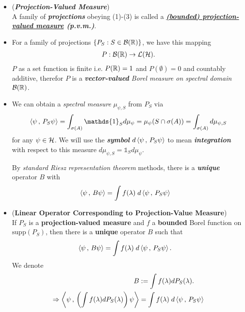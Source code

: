 \documentclass[11pt]{article}
\begin{document}
\begin{itemize}
\item \begin{definition} (\textbf{\emph{Projection-Valued Measure}})\\
A family of \textbf{\emph{projections}} obeying (1)-(3) is called a \emph{\textbf{\underline{(bounded) projection-valued measure} (p.v.m.)}}. 
\end{definition}

\item \begin{remark}
For a family of projections $\left\{P_{S}: S \in {\mathcal B}({\mathbb R})\right\}$, we have this mapping 
\begin{align*}
P: {\mathcal B}({\mathbb R}) \to {\mathcal L}({\mathcal H}).
\end{align*} $P$ as a set function is finite i.e. $P({\mathbb R})= 1$ and $P(\emptyset) = 0$ and countably additive, therefor $P$ is a \emph{\textbf{vector-valued} Borel measure on spectral domain} ${\mathcal B}({\mathbb R})$.
\end{remark}

\item \begin{remark}
We can obtain a \emph{spectral measure} $\mu_{\psi, S}$ from $P_{S}$ via
\begin{align*}
\inn{\psi}{P_S \psi} = \int_{\sigma(A)} \mathds{1}_{S}d\mu_{\psi} = \mu_{\psi}(S \cap \sigma(A)) =\int_{\sigma(A)} d\mu_{\psi, S}
\end{align*} for any $\psi \in {\mathcal H}$. We will use the \emph{\textbf{symbol}} $d\left\langle \psi\,,\, P_S \psi \right\rangle$ to mean \emph{\textbf{integration}} with respect to this measure $d\mu_{\psi, S}=  \mathds{1}_{S}d\mu_{\psi}$. 

By \emph{standard Riesz representation theorem} methods, there is a \emph{\textbf{unique}} operator $Β$ with
\begin{align*}
\left\langle \psi\,,\, B\psi \right\rangle &= \int  f(\lambda) \;d\left\langle \psi\,,\, P_S \psi \right\rangle
\end{align*} 
\end{remark}

\item \begin{proposition} (\textbf{Linear Operator Corresponding to Projection-Value Measure}) \citep{reed1980methods}\\
If $P_{S}$ is a \textbf{projection-valued measure} and $f$ a \textbf{bounded} Borel function on $\text{supp}(P_{S})$, then there is a \textbf{unique} operator $B$ such that
\begin{align*}
\left\langle \psi\,,\, B\psi \right\rangle &= \int f(\lambda) \;d\left\langle \psi\,,\, P_S \psi \right\rangle.
\end{align*} We denote 
\begin{align*}
B &:= \int  f(\lambda) dP_{S}(\lambda).\\
\Rightarrow \left\langle \psi\,,\, \left(\int  f(\lambda) dP_{S}(\lambda)\right)\psi \right\rangle &=  \int f(\lambda) \;d\left\langle \psi\,,\, P_S \psi \right\rangle
\end{align*}
\end{proposition}


\end{itemize}
\end{document}
